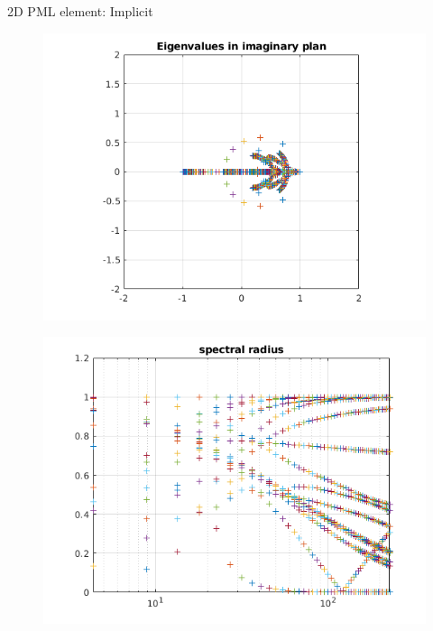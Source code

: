 \begin{frame}{2D PML element: Implicit}
\begin{figure}[ht] 
  \label{ fig7} 
  \begin{minipage}[b]{0.5\linewidth}
    \centering
    \includegraphics[scale=.4]{images/2Dpml-imp-1.png} \\

  \end{minipage}%
  \begin{minipage}[b]{0.5\linewidth}
    \centering
    \includegraphics[scale=.4]{images/2Dpml-imp-2.png} \\
  \end{minipage} 

\end{figure}
\end{frame}

